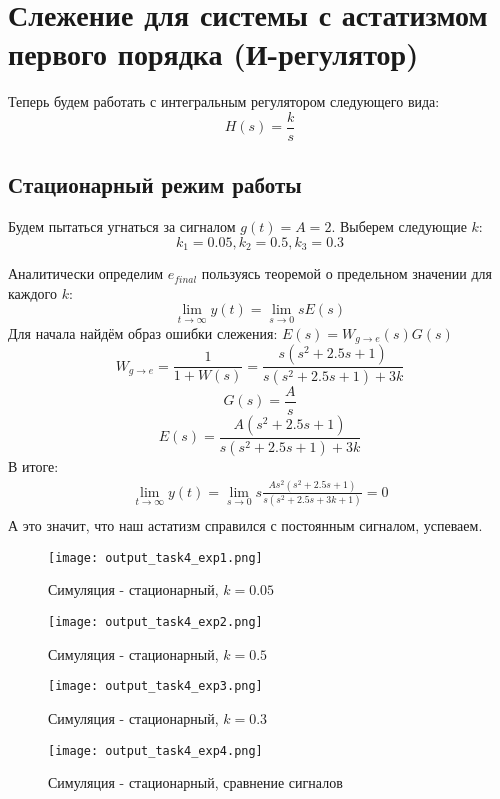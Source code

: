 \chapter{Слежение для системы с астатизмом первого порядка (И-регулятор)}
\label{ch:chap4}

Теперь будем работать с интегральным регулятором следующего вида:
$$
H(s) = \frac{k}{s}
$$


\section{Стационарный режим работы}
Будем пытаться угнаться за сигналом $g(t) = A = 2$.
Выберем следующие $k$:
$$
k_1 = 0.05, k_2 = 0.5,  k_3 = 0.3
$$

Аналитически определим $e_{final}$ пользуясь теоремой о предельном значении для каждого $k$:
$$
\lim_{t\to\infty} y(t) = \lim_{s\to 0}sE(s)
$$
Для начала найдём образ ошибки слежения: $E(s) = W_{g\to e}(s)G(s)$
$$
W_{g\to e} = \frac{1}{1+W(s)} = \frac{s(s^2 +2.5s + 1)}{s(s^2 + 2.5s + 1) + 3k}
$$
$$
G(s) = \frac{A}{s}
$$
$$
E(s) = \frac{A(s^2 +2.5s + 1)}{s(s^2 + 2.5s + 1) + 3k}
$$
В итоге:
$$
\begin{aligned}
  \lim_{t\to\infty} y(t) = \lim_{s\to 0}s\frac{As^2(s^2 +2.5s + 1)}{s(s^2 + 2.5s + 3k + 1)} = 0\\
\end{aligned}
$$
А это значит, что наш астатизм справился с постоянным сигналом, успеваем.

\begin{figure}[ht]
  \centering
  \texttt{[image: output\_task4\_exp1.png]}
\caption{Симуляция - стационарный, $k=0.05$}
\end{figure}

\newpage
\begin{figure}[ht]
  \centering
  \texttt{[image: output\_task4\_exp2.png]}
\caption{Симуляция - стационарный, $k=0.5$}
\end{figure}

\begin{figure}[ht]
  \centering
  \texttt{[image: output\_task4\_exp3.png]}
\caption{Симуляция - стационарный, $k=0.3$}
\end{figure}

\newpage
\begin{figure}[ht]
  \centering
  \texttt{[image: output\_task4\_exp4.png]}
\caption{Симуляция - стационарный, сравнение сигналов}
\end{figure}

